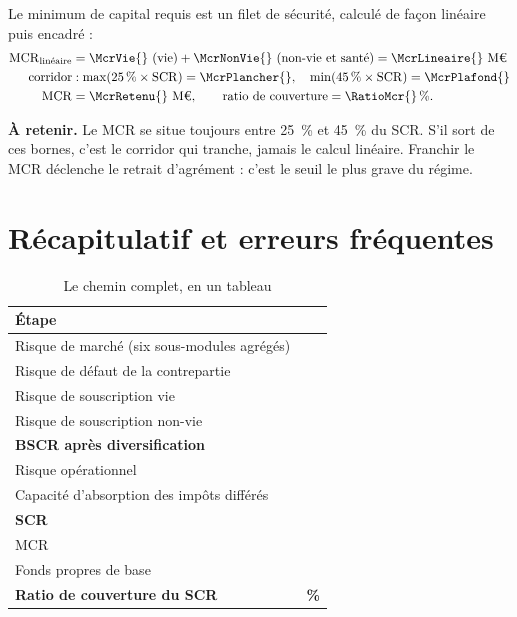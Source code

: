 \documentclass[11pt,a4paper]{article}
\newcommand{\astuce}[1]{\par\smallskip\noindent\textcolor{vertfonce}{\textbf{À retenir.}} #1\par\smallskip}
\newcommand{\Meuro}{\text{M\texteuro}}
\begin{document}
Le minimum de capital requis est un filet de sécurité, calculé de façon linéaire puis encadré :
\begin{align*}
\mathrm{MCR}_{\text{linéaire}} &= \McrVie{} \text{ (vie)} + \McrNonVie{} \text{ (non-vie et santé)}
= \McrLineaire{}~\Meuro{}\\
\text{corridor} &: \max(25\,\% \times \mathrm{SCR}) = \McrPlancher{}, \quad
\min(45\,\% \times \mathrm{SCR}) = \McrPlafond{}\\
\mathrm{MCR} &= \McrRetenu{}~\Meuro{}, \qquad \text{ratio de couverture} = \RatioMcr{}\,\%.
\end{align*}

\astuce{Le MCR se situe toujours entre \qty{25}{\percent} et \qty{45}{\percent} du SCR. S'il sort
de ces bornes, c'est le corridor qui tranche, jamais le calcul linéaire. Franchir le MCR déclenche
le retrait d'agrément : c'est le seuil le plus grave du régime.}

\section{Récapitulatif et erreurs fréquentes}

\begin{table}[h]\centering\small
\caption{Le chemin complet, en un tableau}
\begin{tabularx}{\linewidth}{Xr}
\toprule
Étape & \Meuro{}\\
\midrule
Risque de marché (six sous-modules agrégés) & \MarcheAgrege{}\\
Risque de défaut de la contrepartie & \CpAgrege{}\\
Risque de souscription vie & \VieAgrege{}\\
Risque de souscription non-vie & \NvAgrege{}\\
\textbf{BSCR après diversification} & \textbf{\BscrAgrege{}}\\
Risque opérationnel & \OpTotal{}\\
Capacité d'absorption des impôts différés & \LacDt{}\\
\textbf{SCR} & \textbf{\ScrFinal{}}\\
MCR & \McrRetenu{}\\
Fonds propres de base & \FondsPropres{}\\
\textbf{Ratio de couverture du SCR} & \textbf{\RatioScr{}\,\%}\\
\bottomrule
\end{tabularx}
\end{table}
\end{document}
